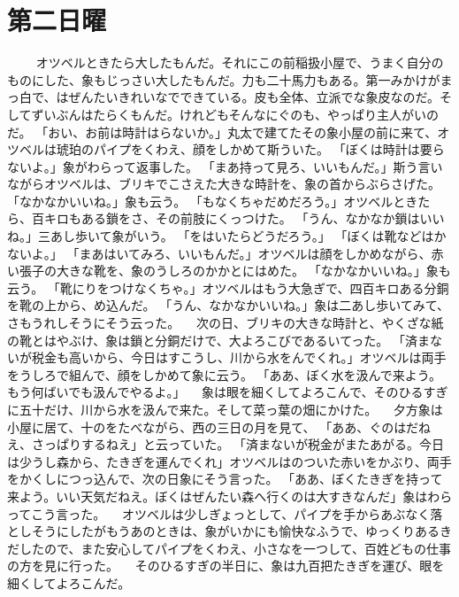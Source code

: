 \section*{第二日曜}
　
　オツベルときたら大したもんだ。それにこの前稲扱小屋で、うまく自分のものにした、象もじっさい大したもんだ。力も二十馬力もある。第一みかけがまっ白で、はぜんたいきれいなでできている。皮も全体、立派でな象皮なのだ。そしてずいぶんはたらくもんだ。けれどもそんなにぐのも、やっぱり主人がいのだ。
「おい、お前は時計はらないか。」丸太で建てたその象小屋の前に来て、オツベルは琥珀のパイプをくわえ、顔をしかめて斯ういた。
「ぼくは時計は要らないよ。」象がわらって返事した。
「まあ持って見ろ、いいもんだ。」斯う言いながらオツベルは、ブリキでこさえた大きな時計を、象の首からぶらさげた。
「なかなかいいね。」象も云う。
「もなくちゃだめだろう。」オツベルときたら、百キロもある鎖をさ、その前肢にくっつけた。
「うん、なかなか鎖はいいね。」三あし歩いて象がいう。
「をはいたらどうだろう。」
「ぼくは靴などはかないよ。」
「まあはいてみろ、いいもんだ。」オツベルは顔をしかめながら、赤い張子の大きな靴を、象のうしろのかかとにはめた。
「なかなかいいね。」象も云う。
「靴にりをつけなくちゃ。」オツベルはもう大急ぎで、四百キロある分銅を靴の上から、め込んだ。
「うん、なかなかいいね。」象は二あし歩いてみて、さもうれしそうにそう云った。
　次の日、ブリキの大きな時計と、やくざな紙の靴とはやぶけ、象は鎖と分銅だけで、大よろこびであるいてった。
「済まないが税金も高いから、今日はすこうし、川から水をんでくれ。」オツベルは両手をうしろで組んで、顔をしかめて象に云う。
「ああ、ぼく水を汲んで来よう。もう何ばいでも汲んでやるよ。」
　象は眼を細くしてよろこんで、そのひるすぎに五十だけ、川から水を汲んで来た。そして菜っ葉の畑にかけた。
　夕方象は小屋に居て、十のをたべながら、西の三日の月を見て、
「ああ、ぐのはだねえ、さっぱりするねえ」と云っていた。
「済まないが税金がまたあがる。今日は少うし森から、たきぎを運んでくれ」オツベルはのついた赤いをかぶり、両手をかくしにつっ込んで、次の日象にそう言った。
「ああ、ぼくたきぎを持って来よう。いい天気だねえ。ぼくはぜんたい森へ行くのは大すきなんだ」象はわらってこう言った。
　オツベルは少しぎょっとして、パイプを手からあぶなく落としそうにしたがもうあのときは、象がいかにも愉快なふうで、ゆっくりあるきだしたので、また安心してパイプをくわえ、小さなを一つして、百姓どもの仕事の方を見に行った。
　そのひるすぎの半日に、象は九百把たきぎを運び、眼を細くしてよろこんだ。
